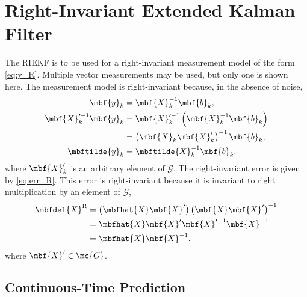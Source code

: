 \section{Right-Invariant Extended Kalman Filter}
\label{sec:RIEFK}

The RIEKF is to be used for a right-invariant measurement model of the form \eqref{eq:y_R}. Multiple vector measurements may be used, but only one is shown here. The measurement model is right-invariant because, in the absence of noise, 
\begin{align*}
	\mbf{y}_k & = \mbf{X}_k^{-1}\mbf{b}_k, \\
	\mbf{X}_{k}'^{-1}\mbf{y}_k &  = \mbf{X}_{k}'^{-1}\left(\mbf{X}_k^{-1} \mbf{b}_k \right) \\
	&  = \left(\mbf{X}_k\mbf{X}_{k}'\right)^{-1}\mbf{b}_k,  \\
	\mbftilde{y}_k & = \mbftilde{X}_k^{-1}\mbf{b}_k.
\end{align*}
where $\mbf{X}_{k}'$ is an arbitrary element of $\mathcal{G}$. The right-invariant error is given by \eqref{eq:err_R}. This error is right-invariant because it is invariant to right multiplication by an element of $\mathcal{G}$, 
\begin{align*}
	\mbfdel{X}^\mathrm{R} & = \left(\mbfhat{X}\mbf{X}'\right)\left(\mbf{X} \mbf{X}'\right)^{-1} \\
	& = \mbfhat{X}\mbf{X}'\mbf{X}'^{-1}\mbf{X}^{-1} \\
	& = \mbfhat{X} \mbf{X}^{-1}.
\end{align*}
where $\mbf{X}' \in \mc{G}$.

\subsection{Continuous-Time Prediction}
\label{ssec:ctp_R}


